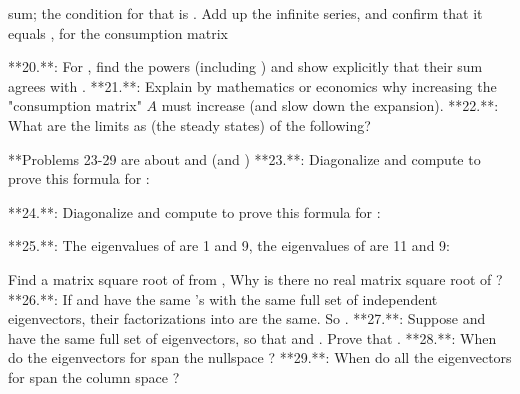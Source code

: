 sum; the condition for that is . Add up the infinite series, and confirm that it equals , for the consumption matrix

**20.**: For , find the powers (including ) and show explicitly that their sum agrees with .
**21.**: Explain by mathematics or economics why increasing the "consumption matrix" \(A\) must increase (and slow down the expansion).
**22.**: What are the limits as (the steady states) of the following?

**Problems 23-29 are about and (and )
**23.**: Diagonalize and compute to prove this formula for :

**24.**: Diagonalize and compute to prove this formula for :

**25.**: The eigenvalues of are 1 and 9, the eigenvalues of are 11 and 9:

Find a matrix square root of from , Why is there no real matrix square root of ?
**26.**: If and have the same 's with the same full set of independent eigenvectors, their factorizations into are the same. So .
**27.**: Suppose and have the same full set of eigenvectors, so that and . Prove that .
**28.**: When do the eigenvectors for span the nullspace ?
**29.**: When do all the eigenvectors for span the column space ? 